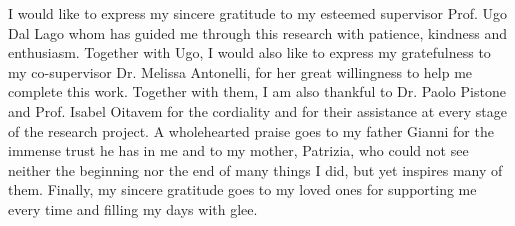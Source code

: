 I would like to express my sincere gratitude to my esteemed supervisor Prof. Ugo Dal Lago
whom has guided me through this research with patience, kindness and enthusiasm.
Together with Ugo, I would also like to express my gratefulness
to my co-supervisor Dr. Melissa Antonelli, for her great willingness
to help me complete this work.
Together with them, I am also thankful to Dr. Paolo Pistone and Prof. Isabel Oitavem
for the cordiality and for their assistance at every stage of the research project.
%
A wholehearted praise goes to my father Gianni for
the immense trust he has in me and to my mother, Patrizia,
who could not see neither
the beginning nor the end of many things I did, but
yet inspires many of them.
%
Finally, my sincere gratitude goes to my loved ones for supporting me every time
and filling my days with glee.
